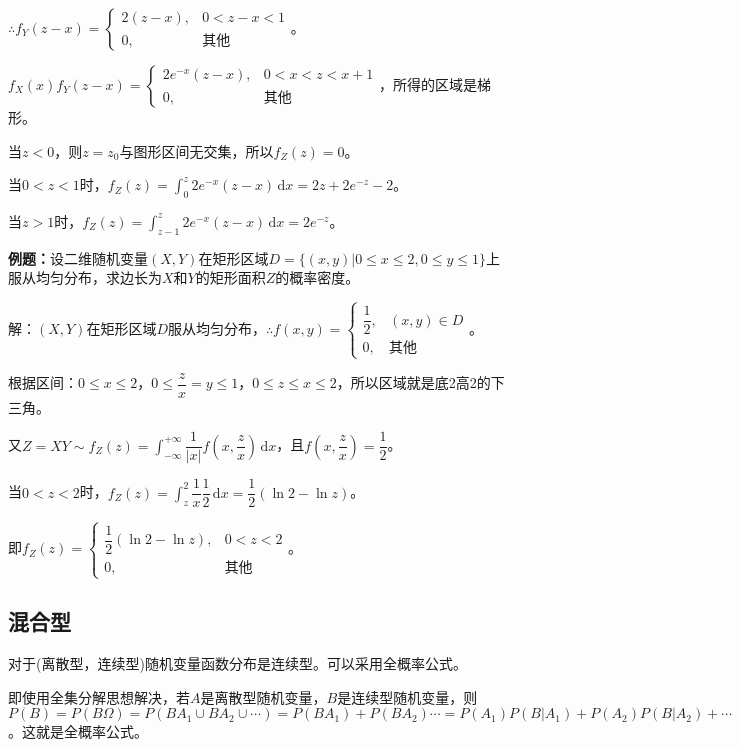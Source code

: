 \documentclass[UTF8, 12pt]{ctexart}
\begin{document}
$\therefore f_Y(z-x)=\left\{\begin{array}{ll}
    2(z-x), & 0<z-x<1 \\
    0, & \textbf{其他}
\end{array}\right.$。

$f_X(x)f_Y(z-x)=\left\{\begin{array}{ll}
    2e^{-x}(z-x), & 0<x<z<x+1 \\
    0, & \text{其他}
\end{array}\right.$，所得的区域是梯形。

当$z<0$，则$z=z_0$与图形区间无交集，所以$f_Z(z)=0$。

当$0<z<1$时，$f_Z(z)=\int_0^z2e^{-x}(z-x)\,\textrm{d}x=2z+2e^{-z}-2$。

当$z>1$时，$f_Z(z)=\int_{z-1}^z2e^{-x}(z-x)\,\textrm{d}x=2e^{-z}$。

\textbf{例题：}设二维随机变量$(X,Y)$在矩形区域$D=\{(x,y)|0\leqslant x\leqslant 2,0\leqslant y\leqslant 1\}$上服从均匀分布，求边长为$X$和$Y$的矩形面积$Z$的概率密度。

解：$(X,Y)$在矩形区域$D$服从均匀分布，$\therefore f(x,y)=\left\{\begin{array}{ll}
    \dfrac{1}{2}, & (x,y)\in D \\
    0, & \text{其他}
\end{array}\right.$。

根据区间：$0\leqslant x\leqslant2$，$0\leqslant\dfrac{z}{x}=y\leqslant1$，$0\leqslant z\leqslant x\leqslant2$，所以区域就是底2高2的下三角。

又$Z=XY\sim f_Z(z)=\displaystyle{\int_{-\infty}^{+\infty}\dfrac{1}{\vert x\vert}f\left(x,\dfrac{z}{x}\right)\,\textrm{d}x}$，且$f\left(x,\dfrac{z}{x}\right)=\dfrac{1}{2}$。

当$0<z<2$时，$f_Z(z)=\displaystyle{\int_z^2}\dfrac{1}{x}\dfrac{1}{2}\,\textrm{d}x=\dfrac{1}{2}(\ln2-\ln z)$。

即$f_Z(z)=\left\{\begin{array}{ll}
    \dfrac{1}{2}(\ln2-\ln z), & 0<z<2 \\
    0, & \text{其他}
\end{array}\right.$。

\subsection{混合型}
 
对于(离散型，连续型)随机变量函数分布是连续型。可以采用全概率公式。

即使用全集分解思想解决，若$A$是离散型随机变量，$B$是连续型随机变量，则$P(B)=P(B\Omega)=P(BA_1\cup BA_2\cup\cdots)=P(BA_1)+P(BA_2)\cdots=P(A_1)P(B|A_1)+P(A_2)P(B|A_2)+\cdots$。这就是全概率公式。
\end{document}
